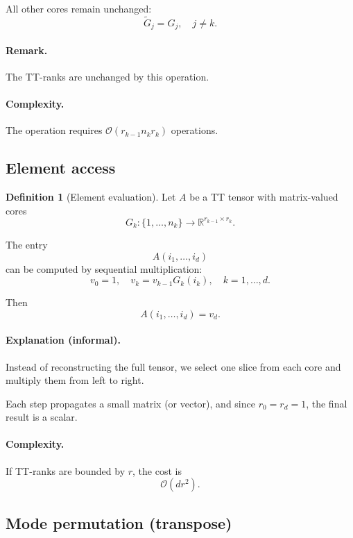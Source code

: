 \documentclass[11pt,a4paper,parskip=half-]{scrartcl}
\theoremstyle{definition}
\newtheorem{definition}{Definition}[section]
\theoremstyle{plain}
\theoremstyle{remark}
\begin{document}
All other cores remain unchanged:
\[
\tilde{G}_j = G_j, \quad j \neq k.
\]

\paragraph{Remark.}
The TT-ranks are unchanged by this operation.

\paragraph{Complexity.}
The operation requires $\mathcal{O}(r_{k-1} n_k r_k)$ operations.

\subsection{Element access}

\begin{definition}[Element evaluation]

Let $A$ be a TT tensor with matrix-valued cores
\[
G_k : \{1,\dots,n_k\} \to \mathbb{R}^{r_{k-1}\times r_k}.
\]

The entry
\[
A(i_1,\dots,i_d)
\]
can be computed by sequential multiplication:
\[
v_0 = 1,
\quad
v_k = v_{k-1} G_k(i_k),
\quad
k=1,\dots,d.
\]

Then
\[
A(i_1,\dots,i_d) = v_d.
\]

\end{definition}

\paragraph{Explanation (informal).}

Instead of reconstructing the full tensor, we select one slice from each core
and multiply them from left to right.

Each step propagates a small matrix (or vector), and since $r_0=r_d=1$,
the final result is a scalar.

\paragraph{Complexity.}

If TT-ranks are bounded by $r$, the cost is
\[
\mathcal{O}(d r^2).
\]

\subsection{Mode permutation (transpose)}
\label{sec:mode-permutation}
\end{document}

